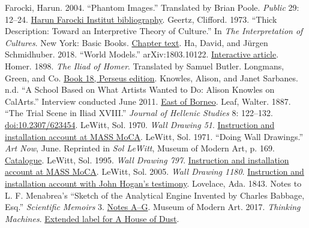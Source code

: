 \documentclass[11pt,letterpaper]{article}
\newcommand{\work}[1]{\textit{#1}}
\newcommand{\src}[2]{\href{#1}{#2}}
\begin{document}
\begin{thebibliography}{99}
 Farocki, Harun. 2004. “Phantom Images.” Translated by Brian Poole. \work{Public} 29: 12–24. \src{https://archiv.harun-farocki-institut.org/en/bibliografie/text/phantom-images/}{Harun Farocki Institut bibliography}.
 Geertz, Clifford. 1973. “Thick Description: Toward an Interpretive Theory of Culture.” In \work{The Interpretation of Cultures}. New York: Basic Books. \src{https://people.ucsc.edu/~ktellez/geertz1973.pdf}{Chapter text}.
 Ha, David, and Jürgen Schmidhuber. 2018. “World Models.” arXiv:1803.10122. \src{https://worldmodels.github.io/}{Interactive article}.
 Homer. 1898. \work{The Iliad of Homer}. Translated by Samuel Butler. Longmans, Green, and Co. \src{https://beta.perseus.tufts.edu/urn:cts:greekLit:tlg0012.tlg001.perseus-eng4:18.497/}{Book 18, Perseus edition}.
 Knowles, Alison, and Janet Sarbanes. n.d. “A School Based on What Artists Wanted to Do: Alison Knowles on CalArts.” Interview conducted June 2011. \src{https://eastofborneo.org/articles/a-school-based-on-what-artists-wanted-to-do-alison-knowles-on-calarts/}{East of Borneo}.
 Leaf, Walter. 1887. “The Trial Scene in Iliad XVIII.” \work{Journal of Hellenic Studies} 8: 122–132. \src{https://doi.org/10.2307/623454}{doi:10.2307/623454}.
 LeWitt, Sol. 1970. \work{Wall Drawing 51}. \src{https://massmoca.org/event/walldrawing51/}{Instruction and installation account at MASS MoCA}.
 LeWitt, Sol. 1971. “Doing Wall Drawings.” \work{Art Now}, June. Reprinted in \work{Sol LeWitt}, Museum of Modern Art, p. 169. \src{https://www.moma.org/documents/moma_catalogue_1971_300297572.pdf}{Catalogue}.
 LeWitt, Sol. 1995. \work{Wall Drawing 797}. \src{https://massmoca.org/event/walldrawing797/}{Instruction and installation account at MASS MoCA}.
 LeWitt, Sol. 2005. \work{Wall Drawing 1180}. \src{https://massmoca.org/event/wall-drawing-1180/}{Instruction and installation account with John Hogan’s testimony}.
 Lovelace, Ada. 1843. Notes to L. F. Menabrea’s “Sketch of the Analytical Engine Invented by Charles Babbage, Esq.” \work{Scientific Memoirs} 3. \src{https://psychclassics.yorku.ca/Lovelace/lovelace.htm}{Notes A–G}.
 Museum of Modern Art. 2017. \work{Thinking Machines}. \src{https://press.moma.org/wp-content/files_mf/thinking_machines_ext_labels_r8.pdf}{Extended label for A House of Dust}.

\end{thebibliography}
\end{document}

